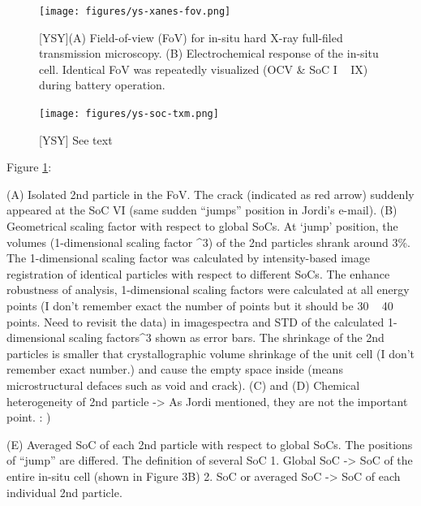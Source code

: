 \documentclass{article}
\begin{document}
\begin{figure}
  \texttt{[image: figures/ys-xanes-fov.png]}
  \caption{[YSY](A) Field-of-view (FoV) for in-situ hard X-ray full-filed
    transmission microscopy. (B) Electrochemical response of the
    in-situ cell. Identical FoV was repeatedly visualized (OCV \& SoC I
    ~ IX) during battery operation.}
\end{figure}

\begin{figure}
  \texttt{[image: figures/ys-soc-txm.png]}
  \caption{[YSY] See text}
  \label{ys-soc-txm}
\end{figure}

Figure \ref{ys-soc-txm}:

(A) Isolated 2nd particle in the FoV. The crack (indicated as red
arrow) suddenly appeared at the SoC VI (same sudden ``jumps'' position
in Jordi's e-mail). (B) Geometrical scaling factor with respect to
global SoCs. At ‘jump’ position, the volumes (1-dimensional scaling
factor \textasciicircum3) of the 2nd particles shrank around 3\%. The 1-dimensional
scaling factor was calculated by intensity-based image registration of
identical particles with respect to different SoCs. The enhance
robustness of analysis, 1-dimensional scaling factors were calculated
at all energy points (I don't remember exact the number of points but
it should be 30 ~ 40 points. Need to revisit the data) in imagespectra
and STD of the calculated 1-dimensional scaling factors\^{}3 shown as
error bars.  The shrinkage of the 2nd particles is smaller that
crystallographic volume shrinkage of the unit cell (I don't remember
exact number.) and cause the empty space inside (means microstructural
defaces such as void and crack).  (C) and (D) Chemical heterogeneity
of 2nd particle -> As Jordi mentioned, they are not the important
point. : )

(E) Averaged SoC of each 2nd particle with respect to global
SoCs. The positions of ``jump'' are differed.  The definition of
several SoC 1. Global SoC -> SoC of the entire in-situ cell (shown
in Figure 3B) 2. SoC or averaged SoC -> SoC of each individual 2nd
particle.
\end{document}
